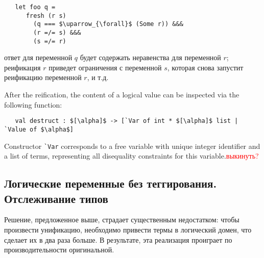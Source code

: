 
\begin{lstlisting}
   let foo q =
      fresh (r s)
        (q === $\uparrow_{\forall}$ (Some r)) &&&
        (r =/= s) &&&
        (s =/= r)
\end{lstlisting}

\noindent ответ для переменной  $q$ будет содержать неравенства для переменной $r$; реификация $r$ приведет ограничения с переменной $s$, которая снова запустит реификацию переменной $r$, и т.д.


After the reification, the content of a logical value can be inspected via the following function:

\begin{lstlisting}
   val destruct : $[\alpha]$ -> [`Var of int * $[\alpha]$ list | `Value of $\alpha$]
\end{lstlisting}

Constructor \lstinline|`Var| corresponds to a free variable with unique integer identifier and a list of terms,
representing all disequality constraints for this variable.\textcolor{red}{выкинуть?}

\subsection{Логические переменные без теггирования. Отслеживание типов}

Решение, предложенное выше, страдает существенным недостатком: чтобы произвести унификацию, необходимо привести термы в логический домен, что сделает их в два раза больше. В результате, эта реализация проиграет по производительности оригинальной.



